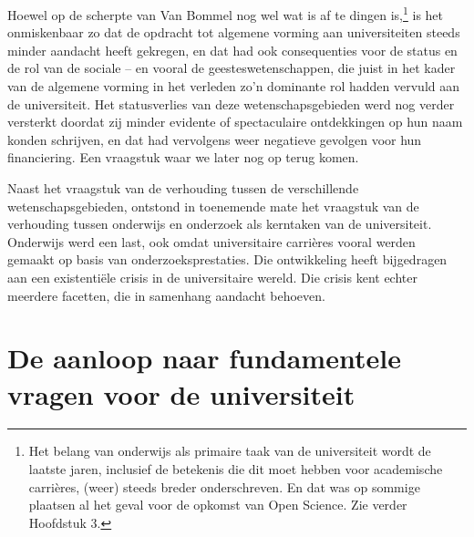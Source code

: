 \documentclass{jote-book}
\begin{document}
	Hoewel op de scherpte van Van Bommel nog wel wat is af te dingen is,\footnote{Het belang van onderwijs als primaire taak van de universiteit wordt de laatste jaren, inclusief de betekenis die dit moet hebben voor academische carrières, (weer) steeds breder onderschreven. En dat was op sommige plaatsen al het geval voor de opkomst van Open Science. Zie verder Hoofdstuk 3. } is het onmiskenbaar zo dat de opdracht tot algemene vorming aan universiteiten steeds minder aandacht heeft gekregen, en dat had ook consequenties voor de status en de rol van de sociale -- en vooral de geesteswetenschappen, die juist in het kader van de algemene vorming in het verleden zo'n dominante rol hadden vervuld aan de universiteit. Het statusverlies van deze wetenschapsgebieden werd nog verder versterkt doordat zij minder evidente of spectaculaire ontdekkingen op hun naam konden schrijven, en dat had vervolgens weer negatieve gevolgen voor hun financiering. Een vraagstuk waar we later nog op terug komen.



	Naast het vraagstuk van de verhouding tussen de verschillende wetenschapsgebieden, ontstond in toenemende mate het vraagstuk van de verhouding tussen onderwijs en onderzoek als kerntaken van de universiteit. Onderwijs werd een last, ook omdat universitaire carrières vooral werden gemaakt op basis van onderzoeksprestaties. Die ontwikkeling heeft bijgedragen aan een existentiële crisis in de universitaire wereld. Die crisis kent echter meerdere facetten, die in samenhang aandacht behoeven.



	\section{De aanloop naar fundamentele vragen voor de universiteit}
\end{document}
